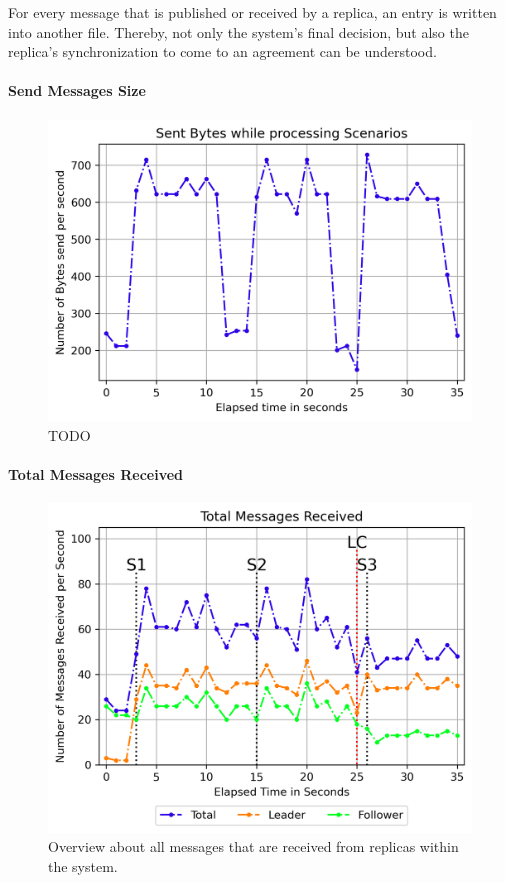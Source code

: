 \iffalse


For every message that is published or received by a replica, an entry is written into another file.
Thereby, not only the system's final decision, but also the replica's synchronization to come to an agreement can be understood.

\paragraph{Send Messages Size}
\begin{figure}[!hb]
	\centering
	\includegraphics[width=0.75\linewidth]{images/plots/scenarioProcessingMessageSize}
	\caption{TODO}
	\label{fig:messageSizeScenarioProcessing}
\end{figure}


\paragraph{Total Messages Received}

\begin{figure}[!hb]
	\centering
	\includegraphics[width=0.75\linewidth]{images/plots/TotalMessagesReceive}
	\caption{Overview about all messages that are received from replicas within the system.}
	\label{fig:PlotTotalMessagesReceive}
\end{figure}

